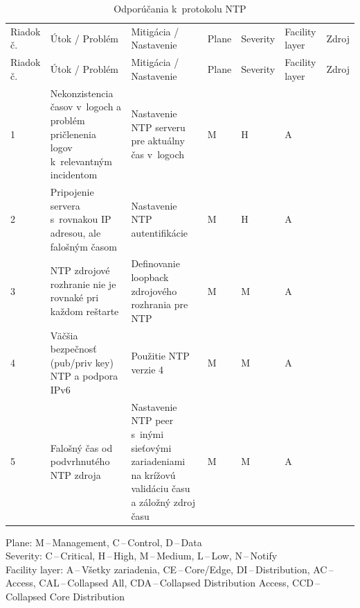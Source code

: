 \begin{longtable}[!htbp]{|C{2.5em}L{11em}L{11em}C{2.5em}C{4em}C{5em}L{2.5em}|}
	
	\caption{Odporúčania k~protokolu NTP}
	\label{tab:ntp}\\ \hline
	\mbox{Riadok} č.&Útok / Problém	&Mitigácia / Nastavenie	&Plane	&Severity	&Facility layer	&Zdroj\\ \hhline{=======}
	\endfirsthead 
	\hline
	\centering
	
	Riadok č.	&Útok / Problém	&Mitigácia / Nastavenie	&Plane	&Severity	&Facility layer	&Zdroj\\ \hhline{=======}
	\endhead
	
	 1	&Nekonzistencia časov v~logoch a problém pričlenenia logov k~relevantným incidentom	&Nastavenie NTP serveru pre aktuálny čas v~logoch	&M	&H	&A	& \cite{Jackson2010}
	
	\cite{Singh2018}
	
	\cite{CIS_DrTLsgXv24lxeIIM}\\
	2	&Pripojenie servera s~rovnakou IP adresou, ale falošným časom	&Nastavenie NTP autentifikácie	&M	&H	&A	& \cite{Jackson2010}
	
	\cite{Singh2018}
	
	\cite{CIS_DrTLsgXv24lxeIIM}\\
	 3	&NTP zdrojové rozhranie nie je rovnaké pri každom reštarte	& Definovanie loopback zdrojového rozhrania pre NTP	&M	&M	&A	& \cite{Jackson2010}
	
	\cite{Singh2018}
	
	\cite{CIS_DrTLsgXv24lxeIIM}\\
	4	&Väčšia bezpečnosť (pub/priv key) NTP a podpora IPv6	&Použitie NTP verzie 4	&M	&M	&A	&\cite{s0goWNnWp5OjqREE}\\
	 5	&Falošný čas od podvrhnutého NTP zdroja	&Nastavenie NTP peer s~inými sieťovými zariadeniami na krížovú validáciu času a záložný zdroj času	&M	&M	&A	& \cite{Akin2002}\\
	\hline
\end{longtable}%
\vspace{-1em}
{\tiny 
	\noindent
	Plane: M\,--\,Management, C\,--\,Control, D\,--\,Data\\
	Severity: C\,--\,Critical, H\,--\,High, M\,--\,Medium, L\,--\,Low, N\,--\,Notify\\
	Facility layer: A\,--\,Všetky zariadenia, CE\,--\,Core/Edge, DI\,--\,Distribution, AC\,--\,Access, CAL\,--\,Collapsed All, CDA\,--\,Collapsed Distribution Access, CCD\,--\,Collapsed Core Distribution}

